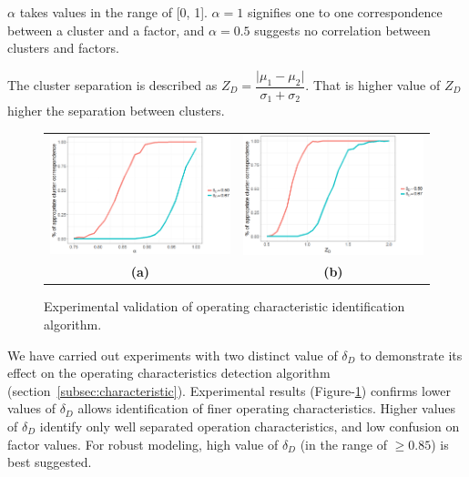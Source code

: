 \documentclass[twoside,leqno,twocolumn]{article}
\begin{document}
$\alpha$ takes values in the range of [0, 1]. $\alpha=1$ signifies one to one correspondence between a cluster and a factor, and $\alpha=0.5$ suggests no correlation between clusters and factors.
\par
The cluster separation is described as $Z_{D} = \dfrac{\vert{\mu}_1 - {\mu}_2\vert}{{\sigma}_1 + {\sigma}_2}$. That is higher value of $Z_D$ higher the separation between clusters.
\begin{figure}
    \centering
	\begin{tabular}{cc}
	\includegraphics[width=8cm]{fig4a} &
	\includegraphics[width=8cm]{fig4b} \\
	{\bf (a)} & {\bf (b)} \\
	\end{tabular}
    \caption{Experimental validation of operating characteristic identification algorithm.}
    \label{fig4}
\end{figure}

We have carried out experiments with two distinct value of $\delta_D$ to demonstrate its effect on the operating characteristics detection algorithm (section~\ref{subsec:characteristic}). Experimental results (Figure-\ref{fig4}) confirms lower values of $\delta_{D}$ allows identification of finer operating characteristics. Higher values of $\delta_{D}$ identify only well separated operation characteristics, and low confusion on factor values. For robust modeling, high value of $\delta_{D}$ (in the range of $\geq 0.85$) is best suggested.
\end{document}
